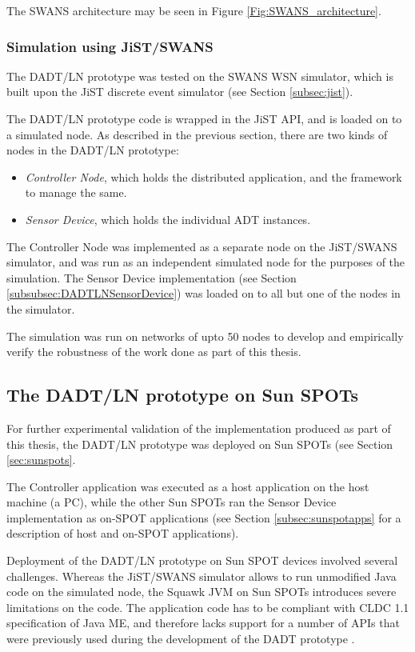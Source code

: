 The SWANS architecture may be seen in Figure \ref{Fig:SWANS_architecture}. 


\subsubsection{Simulation using JiST/SWANS}

The DADT/LN prototype was tested on the SWANS WSN simulator, which is built upon
the JiST discrete event simulator (see Section \ref{subsec:jist}). 

The DADT/LN prototype code is wrapped in the JiST API, and is loaded on to a
simulated node. As described in the previous section, there are two kinds of
nodes in the DADT/LN prototype:

\begin{itemize}
  \item \emph{Controller Node}, which holds the distributed application, and the
  framework to manage the same.
  \item \emph{Sensor Device}, which holds the individual ADT instances. 
\end{itemize}

The Controller Node was implemented as a separate node on the JiST/SWANS
simulator, and was run as an independent simulated node for the purposes of
the simulation. The Sensor Device implementation (see Section
\ref{subsubsec:DADTLNSensorDevice}) was loaded on to all but one of the nodes in
the simulator.

The simulation was run on networks of upto 50 nodes to develop and empirically verify the
robustness of the work done as part of this thesis.

\subsection{The DADT/LN prototype on Sun SPOTs}

For further experimental validation of the implementation produced as part of 
this thesis, the DADT/LN prototype was deployed on Sun SPOTs \cite{simon_squawk:2006} (see Section \ref{sec:sunspots}. 

The Controller application was executed as a host application on the host machine (a
PC), while the other Sun SPOTs ran the Sensor Device implementation as on-SPOT
applications (see Section \ref{subsec:sunspotapps} for a description of host and on-SPOT
applications).

Deployment of the DADT/LN prototype on Sun SPOT devices involved several
challenges. Whereas the JiST/SWANS simulator allows to run unmodified Java code on
the simulated node, the Squawk JVM on Sun SPOTs introduces severe limitations
on the code. The application code has to be compliant with CLDC 1.1
specification of Java ME, and therefore lacks support for a number of APIs that were previously used during the development of the DADT prototype \cite{migliavacca_DADT:2006}.